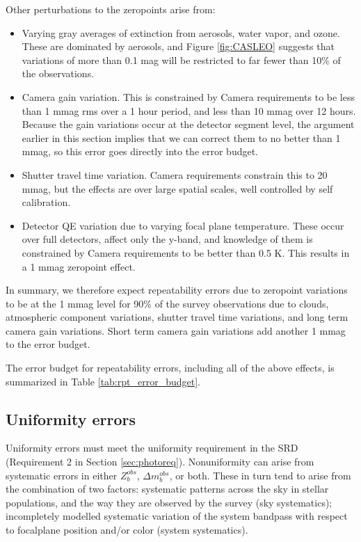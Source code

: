 \documentclass[12pt,preprint]{aastex}
\begin{document}
Other perturbations to the zeropoints arise from:
\begin{itemize}
\item{Varying gray averages of extinction from aerosols, water vapor, and ozone.  These are dominated by aerosols, 
and Figure \ref{fig:CASLEO} suggests that variations of more than 0.1 mag will be restricted to far fewer than 
10\% of the observations.}
\item{Camera gain variation.  This is constrained by Camera requirements to be less than 1 mmag rms over a 1 hour
period, and less than 10 mmag over 12 hours.  Because the gain variations occur at the detector segment level, the
argument earlier in this section implies that we can correct them to no better than 1 mmag, so this error goes
directly into the error budget.}
\item{Shutter travel time variation.  Camera requirements constrain this to 20 mmag, but the effects are over
large spatial scales, well controlled by self calibration.}
\item{Detector QE variation due to varying focal plane temperature. These occur over full detectors,
affect only the y-band, and knowledge of them is constrained by Camera requirements to be better than 0.5 K.
This results in a 1 mmag zeropoint effect. }
\end{itemize}

In summary, we therefore expect repeatability errors due to zeropoint variations to be at the 1 mmag level for 90\% of the 
survey observations due to clouds, atmospheric component variations, shutter travel time variations, and long term 
camera gain variations.  Short term camera gain variations add another 1 mmag to the error budget.

The error budget for repeatability errors, including all of the above effects, is summarized in Table \ref{tab:rpt_error_budget}.

\subsection{Uniformity errors}
Uniformity errors must meet the uniformity requirement in the SRD (Requirement 2 in Section \ref{sec:photoreq}).  Nonuniformity 
can arise from systematic errors in either $Z_b^{obs}$, $\Delta m_b^{obs}$, or both.  
These in turn tend to arise from the combination of two factors: systematic patterns across the sky in stellar populations, 
and the way they are observed by the survey (sky systematics);  
incompletely modelled systematic
variation of the system bandpass with respect to focalplane position and/or color (system systematics).
\end{document}
